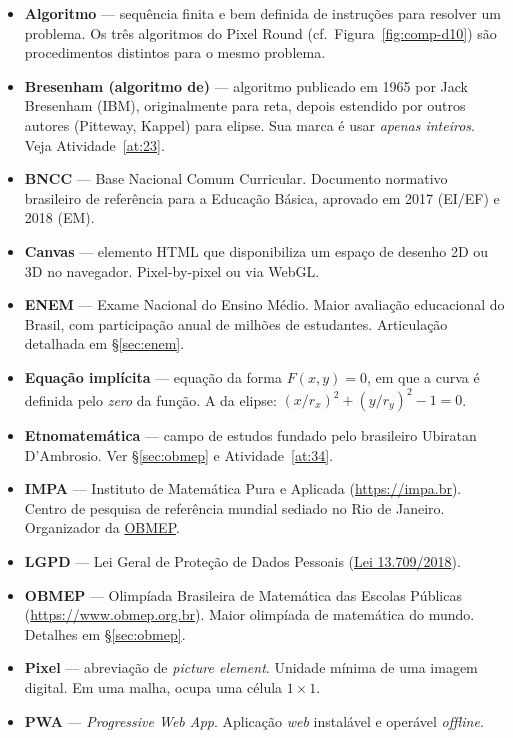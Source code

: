 \documentclass[12pt,a4paper]{scrartcl}
\newcommand{\acc}[1]{\textcolor{accent}{\textbf{#1}}}
\begin{document}
\begin{itemize}[leftmargin=1.4em,itemsep=0.3em,topsep=0.3em]
  \item \acc{Algoritmo} --- sequência finita e bem definida de instruções para resolver um problema. Os três algoritmos do Pixel Round (cf.\ Figura~\ref{fig:comp-d10}) são procedimentos distintos para o mesmo problema.
  \item \acc{Bresenham (algoritmo de)} --- algoritmo publicado em 1965 por Jack Bresenham (IBM), originalmente para reta, depois estendido por outros autores (Pitteway, Kappel) para elipse. Sua marca é usar \emph{apenas inteiros}. Veja Atividade~\ref{at:23}.
  \item \acc{BNCC} --- Base Nacional Comum Curricular. Documento normativo brasileiro de referência para a Educação Básica, aprovado em 2017 (EI/EF) e 2018 (EM).
  \item \acc{Canvas} --- elemento HTML que disponibiliza um espaço de desenho 2D ou 3D no navegador. Pixel-by-pixel ou via WebGL.
  \item \acc{ENEM} --- Exame Nacional do Ensino Médio. Maior avaliação educacional do Brasil, com participação anual de milhões de estudantes. Articulação detalhada em §\ref{sec:enem}.
  \item \acc{Equação implícita} --- equação da forma $F(x, y) = 0$, em que a curva é definida pelo \emph{zero} da função. A da elipse: $(x/r_x)^2 + (y/r_y)^2 - 1 = 0$.
  \item \acc{Etnomatemática} --- campo de estudos fundado pelo brasileiro Ubiratan D'Ambrosio. Ver §\ref{sec:obmep} e Atividade~\ref{at:34}.
  \item \acc{IMPA} --- Instituto de Matemática Pura e Aplicada (\url{https://impa.br}). Centro de pesquisa de referência mundial sediado no Rio de Janeiro. Organizador da \hyperref[sec:obmep]{OBMEP}.
  \item \acc{LGPD} --- Lei Geral de Proteção de Dados Pessoais (\href{https://www.planalto.gov.br/ccivil_03/_ato2015-2018/2018/lei/l13709.htm}{Lei 13.709/2018}).
  \item \acc{OBMEP} --- Olimpíada Brasileira de Matemática das Escolas Públicas (\url{https://www.obmep.org.br}). Maior olimpíada de matemática do mundo. Detalhes em §\ref{sec:obmep}.
  \item \acc{Pixel} --- abreviação de \emph{picture element}. Unidade mínima de uma imagem digital. Em uma malha, ocupa uma célula $1 \times 1$.
  \item \acc{PWA} --- \emph{Progressive Web App}. Aplicação \emph{web} instalável e operável \emph{offline}.

\end{itemize}
\end{document}
